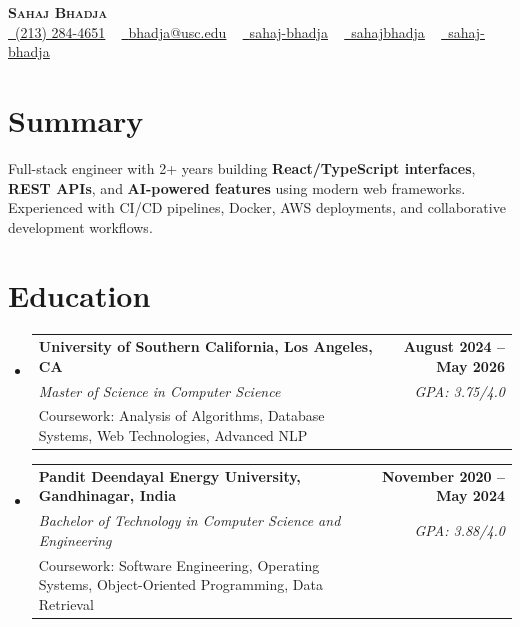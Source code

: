 \documentclass[letterpaper,10pt]{article}
\makeatletter
\newcommand{\resumeEduSubheading}[5]{\vspace{-1pt}\item\begin{tabular*}{1.0\textwidth}[t]{l@{\extracolsep{\fill}}r}\textbf{#1} & \textbf{\small #2} \\\textit{\small #3} & \textit{\small #4} \\\small #5 & \\\end{tabular*}\vspace{-4pt}}
\newcommand{\resumeSubHeadingListStart}{\begin{itemize}[leftmargin=0.0in, label={}]}
\newcommand{\resumeSubHeadingListEnd}{\end{itemize}}
\makeatother
\begin{document}
\begin{center}
{\Huge \scshape \textbf{Sahaj Bhadja}} \\ \vspace{1pt}
\small \href{tel:(213) 284-4651}{\faPhone\ \underline{(213) 284-4651}} ~ \href{mailto:bhadja@usc.edu}{\raisebox{-0.2\height}\faEnvelope\ \underline{bhadja@usc.edu}} ~
\href{https://www.linkedin.com/in/sahaj-bhadja/}{\raisebox{-0.2\height}\faLinkedin\ \underline{sahaj-bhadja}} ~ \href{https://github.com/SAHAJ-BHADJA}{\raisebox{-0.2\height}\faGithub\ \underline{sahajbhadja}} ~
\href{https://sahaj-bhadja.vercel.app/}{\raisebox{-0.2\height}\faGlobe\ \underline{sahaj-bhadja}}
\end{center}
\vspace{-18pt}
\section{Summary}
\begin{itemize}[leftmargin=0.15in, label={}]
\small{\item{Full-stack engineer with 2+ years building \textbf{React/TypeScript interfaces}, \textbf{REST APIs}, and \textbf{AI-powered features} using modern web frameworks. Experienced with CI/CD pipelines, Docker, AWS deployments, and collaborative development workflows.}}
\end{itemize}
\vspace{-16pt}
\section{Education}
\resumeSubHeadingListStart
\resumeEduSubheading{University of Southern California, Los Angeles, CA}{August 2024 -- May 2026}{Master of Science in Computer Science}{GPA: 3.75/4.0}{Coursework: Analysis of Algorithms, Database Systems, Web Technologies, Advanced NLP}
\vspace{-9pt}
\resumeEduSubheading{Pandit Deendayal Energy University, Gandhinagar, India}{November 2020 -- May 2024}{Bachelor of Technology in Computer Science and Engineering}{GPA: 3.88/4.0}{Coursework: Software Engineering, Operating Systems, Object-Oriented Programming, Data Retrieval}
\resumeSubHeadingListEnd
\vspace{-14pt}
\end{document}

